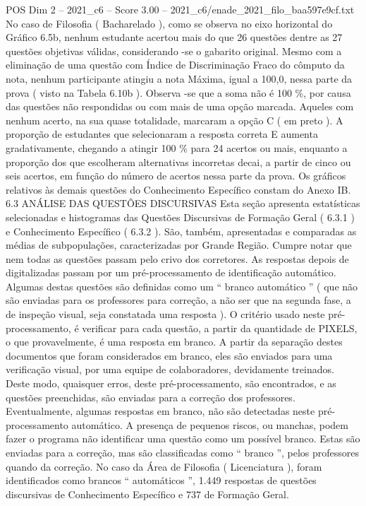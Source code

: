 \begin{textsample}{POS Dim 2 – 2021\_c6 – Score 3.00 – 2021\_c6/enade\_2021\_filo\_baa597e9cf.txt}
No caso de Filosofia ( Bacharelado ), como se observa no eixo horizontal do Gráfico 6.5b, nenhum estudante acertou mais do que 26 questões dentre as 27 questões objetivas válidas, considerando -se o gabarito original.
Mesmo com a eliminação de uma questão com Índice de Discriminação Fraco do cômputo da nota, nenhum participante atingiu a nota Máxima, igual a 100,0, nessa parte da prova ( visto na Tabela 6.10b ).
Observa -se que a soma não é 100 \%, por causa das questões não respondidas ou com mais de uma opção marcada.
Aqueles com nenhum acerto, na sua quase totalidade, marcaram a opção C ( em preto ).
A proporção de estudantes que selecionaram a resposta correta E aumenta gradativamente, chegando a atingir 100 \% para 24 acertos ou mais, enquanto a proporção dos que escolheram alternativas incorretas decai, a partir de cinco ou seis acertos, em função do número de acertos nessa parte da prova.
Os gráficos relativos às demais questões do Conhecimento Específico constam do Anexo IB. 6.3 ANÁLISE DAS QUESTÕES DISCURSIVAS Esta seção apresenta estatísticas selecionadas e histogramas das Questões Discursivas de Formação Geral ( 6.3.1 ) e Conhecimento Específico ( 6.3.2 ).
São, também, apresentadas e comparadas as médias de subpopulações, caracterizadas por Grande Região.
Cumpre notar que nem todas as questões passam pelo crivo dos corretores.
As respostas depois de digitalizadas passam por um pré-processamento de identificação automático.
Algumas destas questões são definidas como um “ branco automático ” ( que não são enviadas para os professores para correção, a não ser que na segunda fase, a de inspeção visual, seja constatada uma resposta ).
O critério usado neste pré-processamento, é verificar para cada questão, a partir da quantidade de PIXELS, o que provavelmente, é uma resposta em branco.
A partir da separação destes documentos que foram considerados em branco, eles são enviados para uma verificação visual, por uma equipe de colaboradores, devidamente treinados.
Deste modo, quaisquer erros, deste pré-processamento, são encontrados, e as questões preenchidas, são enviadas para a correção dos professores.
Eventualmente, algumas respostas em branco, não são detectadas neste pré-processamento automático.
A presença de pequenos riscos, ou manchas, podem fazer o programa não identificar uma questão como um possível branco.
Estas são enviadas para a correção, mas são classificadas como “ branco ”, pelos professores quando da correção.
No caso da Área de Filosofia ( Licenciatura ), foram identificados como brancos “ automáticos ”, 1.449 respostas de questões discursivas de Conhecimento Específico e 737 de Formação Geral.

\end{textsample}

